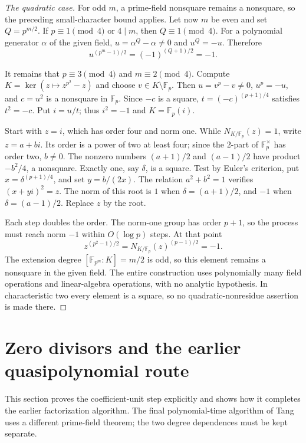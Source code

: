 \documentclass[11pt]{article}
\newcommand{\F}{\mathbb F}
\theoremstyle{definition}
\theoremstyle{remark}
\begin{document}
\begin{proof}[The quadratic case]
For odd $m$, a prime-field nonsquare remains a nonsquare,
so the preceding small-character bound applies.
Let now $m$ be even and set $Q=p^{m/2}$.
If $p\equiv1\pmod4$ or $4\mid m$, then $Q\equiv1\pmod4$.
For a polynomial generator $\alpha$ of the given field,
$u=\alpha^Q-\alpha\ne0$ and $u^Q=-u$.  Therefore
\[
 u^{(p^m-1)/2}=(-1)^{(Q+1)/2}=-1.
\]

It remains that $p\equiv3\pmod4$ and $m\equiv2\pmod4$.
Compute $K=\ker(z\mapsto z^{p^2}-z)$ and choose
$v\in K\setminus\F_p$.  Then $u=v^p-v\ne0$,
$u^p=-u$, and $c=u^2$ is a nonsquare in $\F_p$.
Since $-c$ is a square, $t=(-c)^{(p+1)/4}$ satisfies
$t^2=-c$.  Put $i=u/t$; thus $i^2=-1$ and $K=\F_p(i)$.

Start with $z=i$, which has order four and norm one.
While $N_{K/\F_p}(z)=1$, write $z=a+bi$.
Its order is a power of two at least four; since the
$2$-part of $\F_p^\times$ has order two, $b\ne0$.
The nonzero numbers $(a+1)/2$ and $(a-1)/2$ have product
$-b^2/4$, a nonsquare.  Exactly one, say $\delta$, is a square.
Test by Euler's criterion, put $x=\delta^{(p+1)/4}$,
and set $y=b/(2x)$.  The relation $a^2+b^2=1$ verifies
$(x+yi)^2=z$.  The norm of this root is $1$ when
$\delta=(a+1)/2$, and $-1$ when $\delta=(a-1)/2$.
Replace $z$ by the root.

Each step doubles the order.  The norm-one group has
order $p+1$, so the process must reach norm $-1$ within
$O(\log p)$ steps.  At that point
\[
 z^{(p^2-1)/2}=N_{K/\F_p}(z)^{(p-1)/2}=-1.
\]
The extension degree $[\F_{p^m}:K]=m/2$ is odd, so this
element remains a nonsquare in the given field.  The entire
construction uses polynomially many field operations and
linear-algebra operations, with no analytic hypothesis.
In characteristic two every element is a square, so no
quadratic-nonresidue assertion is made there.
\end{proof}

\section{Zero divisors and the earlier quasipolynomial route}
This section proves the coefficient-unit step explicitly and shows
how it completes the earlier factorization algorithm.
The final polynomial-time algorithm of Tang uses a different
prime-field theorem; the two degree dependences must be kept separate.
\end{document}
